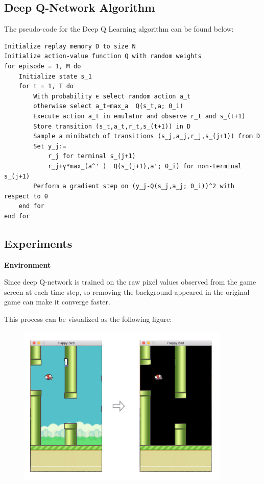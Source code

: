 \documentclass[a4paper, 11pt]{article}
\begin{document}
\href{https://github.com/yenchenlin/DeepLearningFlappyBird\#deep-q-network-algorithm}{}

\subsection*{Deep Q-Network Algorithm}

The pseudo-code for the Deep Q Learning algorithm 
can be found below:

\begin{verbatim}
Initialize replay memory D to size N
Initialize action-value function Q with random weights
for episode = 1, M do
    Initialize state s_1
    for t = 1, T do
        With probability ϵ select random action a_t
        otherwise select a_t=max_a  Q(s_t,a; θ_i)
        Execute action a_t in emulator and observe r_t and s_(t+1)
        Store transition (s_t,a_t,r_t,s_(t+1)) in D
        Sample a minibatch of transitions (s_j,a_j,r_j,s_(j+1)) from D
        Set y_j:=
            r_j for terminal s_(j+1)
            r_j+γ*max_(a^' )  Q(s_(j+1),a'; θ_i) for non-terminal s_(j+1)
        Perform a gradient step on (y_j-Q(s_j,a_j; θ_i))^2 with respect to θ
    end for
end for
\end{verbatim}

\href{https://github.com/yenchenlin/DeepLearningFlappyBird\#experiments}{}

\subsection*{Experiments}

\textbf{Environment}

Since deep Q-network is trained on the raw pixel values observed from the game screen at each time step, so removing the background appeared in the original game can make it converge faster.

This process can be visualized as the following figure:
\begin{figure}
\centering
\includegraphics[width=0.9\textwidth]{Pic/preprocess}
\end{figure}
\end{document}
